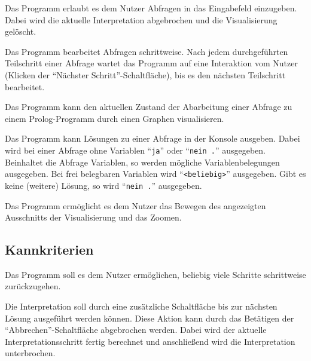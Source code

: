 \documentclass[parskip=full,11pt,twoside]{scrartcl}
\begin{document}

Das Programm erlaubt es dem Nutzer Abfragen in das Eingabefeld einzugeben. Dabei wird die aktuelle Interpretation abgebrochen und die Visualisierung gelöscht.

\newpage
{}

Das Programm bearbeitet Abfragen schrittweise. Nach jedem durchgeführten Teilschritt einer Abfrage wartet das Programm auf eine Interaktion vom Nutzer (Klicken der \enquote{Nächster Schritt}-Schaltfläche), bis es den nächsten Teilschritt bearbeitet.


Das Programm kann den aktuellen Zustand der Abarbeitung einer Abfrage zu einem Prolog-Programm durch einen Graphen visualisieren.


Das Programm kann Lösungen zu einer Abfrage in der Konsole ausgeben. Dabei wird bei einer Abfrage ohne Variablen \enquote{\texttt{ja}} oder \enquote{\texttt{nein .}} ausgegeben. Beinhaltet die Abfrage Variablen, so werden mögliche Variablenbelegungen ausgegeben. Bei frei belegbaren Variablen wird \enquote{\texttt{<beliebig>}} ausgegeben. Gibt es keine (weitere) Lösung, so wird \enquote{\texttt{nein .}} ausgegeben.


Das Programm ermöglicht es dem Nutzer das Bewegen des angezeigten Ausschnitts der Visualisierung und das Zoomen.

\subsection{Kannkriterien}


Das Programm soll es dem Nutzer ermöglichen, beliebig viele Schritte schrittweise zurückzugehen.


Die Interpretation soll durch eine zusätzliche Schaltfläche bis zur nächsten Lösung ausgeführt werden können. Diese Aktion kann durch das Betätigen der \enquote{Abbrechen}-Schaltfläche abgebrochen werden. Dabei wird der aktuelle Interpretationsschritt fertig berechnet und anschließend wird die Interpretation unterbrochen.
\end{document}
